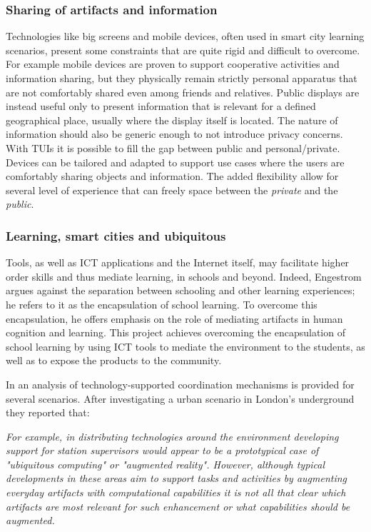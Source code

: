 \subsubsection{Sharing of artifacts and information}
Technologies like big screens and mobile devices, often used in smart city learning scenarios, present some constraints that are quite rigid and difficult to overcome. For example mobile devices are proven to support cooperative activities and information sharing, but they physically remain strictly personal apparatus that are not comfortably shared even among friends and relatives.
Public displays are instead useful only to present information that is relevant for a defined geographical place, usually where the display itself is located. The nature of information should also be generic enough to not introduce privacy concerns.
With TUIs it is possible to fill the gap between public and personal/private. Devices can be tailored and adapted to support use cases where the users are comfortably sharing objects and information.
The added flexibility allow for several level of experience that can freely space between the \textit{private} and the \textit{public}.

\subsubsection{Learning, smart cities and ubiquitous}
Tools, as well as ICT applications and the Internet itself, may facilitate higher order skills and thus mediate learning, in schools and beyond\cite{kashtan_outdoors_2013}. Indeed, Engestrom\cite{engestrom_non_1991} argues against the separation between schooling and other learning experiences; he refers to it as the encapsulation of school learning. To overcome this encapsulation, he offers emphasis on the role of mediating artifacts in human cognition and learning.
This project achieves overcoming the encapsulation of school learning by using ICT tools to mediate the environment to the students, as well as to expose the products to the community\cite{kashtan_outdoors_2013}.

In \cite{luff_mobility_1998} an analysis of technology-supported coordination mechanisms is provided for several scenarios.
After investigating a urban scenario in London's underground they reported that:

\textit{For example, in distributing technologies around the environment developing support for station supervisors would appear to be a prototypical case of "ubiquitous computing" or
"augmented reality". However, although typical developments in these areas aim to support tasks and activities by augmenting everyday artifacts with computational capabilities it is not all that clear which artifacts are most relevant for such enhancement or what capabilities should be augmented.}


